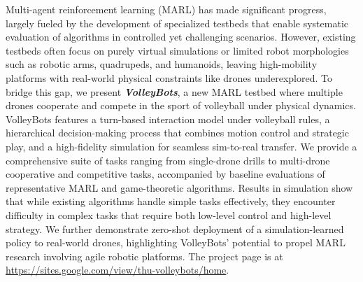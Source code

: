 Multi-agent reinforcement learning (MARL) has made significant progress, largely fueled by the development of specialized testbeds that enable systematic evaluation of algorithms in controlled yet challenging scenarios. However, existing testbeds often focus on purely virtual simulations or limited robot morphologies such as robotic arms, quadrupeds, and humanoids, leaving high-mobility platforms with real-world physical constraints like drones underexplored. To bridge this gap, we present \textbf{\textit{VolleyBots}}, a new MARL testbed where multiple drones cooperate and compete in the sport of volleyball under physical dynamics. VolleyBots features a turn-based interaction model under volleyball rules, a hierarchical decision-making process that combines motion control and strategic play, and a high-fidelity simulation for seamless sim-to-real transfer. We provide a comprehensive suite of tasks ranging from single-drone drills to multi-drone cooperative and competitive tasks, accompanied by baseline evaluations of representative MARL and game-theoretic algorithms. Results in simulation show that while existing algorithms handle simple tasks effectively, they encounter difficulty in complex tasks that require both low-level control and high-level strategy. We further demonstrate zero-shot deployment of a simulation-learned policy to real-world drones, highlighting VolleyBots’ potential to propel MARL research involving agile robotic platforms. The project page is at \url{https://sites.google.com/view/thu-volleybots/home}.
